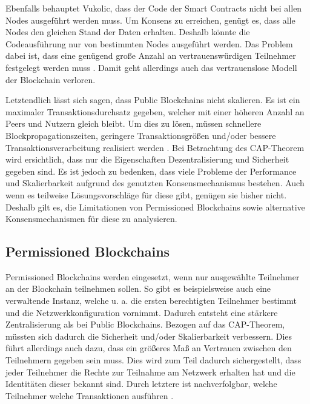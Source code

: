 Ebenfalls behauptet Vukolic, dass der Code der Smart Contracts nicht bei allen Nodes ausgeführt werden muss. Um Konsens zu erreichen, genügt es, dass alle Nodes den gleichen Stand der Daten erhalten. Deshalb könnte die Codeausführung nur von bestimmten Nodes ausgeführt werden. Das Problem dabei ist, dass eine genügend große Anzahl an vertrauenswürdigen Teilnehmer festgelegt werden muss \cite{VukolicRethinkingPermissionedBlockchains2017}. Damit geht allerdings auch das vertrauenslose Modell der Blockchain verloren.

Letztendlich lässt sich sagen, dass Public Blockchains nicht skalieren. Es ist ein maximaler Transaktionsdurchsatz gegeben, welcher mit einer höheren Anzahl an Peers und Nutzern gleich bleibt. Um dies zu lösen, müssen schnellere Blockpropagationszeiten, geringere Transaktionsgrößen und/oder bessere Transaktionsverarbeitung realisiert werden \cite{SchererPerformanceScalabilityBlockchain2017}. Bei Betrachtung des CAP-Theorem wird ersichtlich, dass nur die Eigenschaften Dezentralisierung und Sicherheit gegeben sind. Es ist jedoch zu bedenken, dass viele Probleme der Performance und Skalierbarkeit aufgrund des genutzten Konsensmechanismus bestehen. Auch wenn es teilweise Lösungsvorschläge für diese gibt, genügen sie bisher nicht. Deshalb gilt es, die Limitationen von Permissioned Blockchains sowie alternative Konsensmechanismen für diese zu analysieren.


\subsection{Permissioned Blockchains}
Permissioned Blockchains werden eingesetzt, wenn nur ausgewählte Teilnehmer an der Blockchain teilnehmen sollen. So gibt es beispielsweise auch eine verwaltende Instanz, welche u. a. die ersten berechtigten Teilnehmer bestimmt und die Netzwerkkonfiguration vornimmt. Dadurch entsteht eine stärkere Zentralisierung als bei Public Blockchains. Bezogen auf das CAP-Theorem, müssten sich dadurch die Sicherheit und/oder Skalierbarkeit verbessern. Dies führt allerdings auch dazu, dass ein größeres Maß an Vertrauen zwischen den Teilnehmern gegeben sein muss. Dies wird zum Teil dadurch sichergestellt, dass jeder Teilnehmer die Rechte zur Teilnahme am Netzwerk erhalten hat und die Identitäten dieser bekannt sind. Durch letztere ist nachverfolgbar, welche Teilnehmer welche Transaktionen ausführen \cite{SchererPerformanceScalabilityBlockchain2017}.

